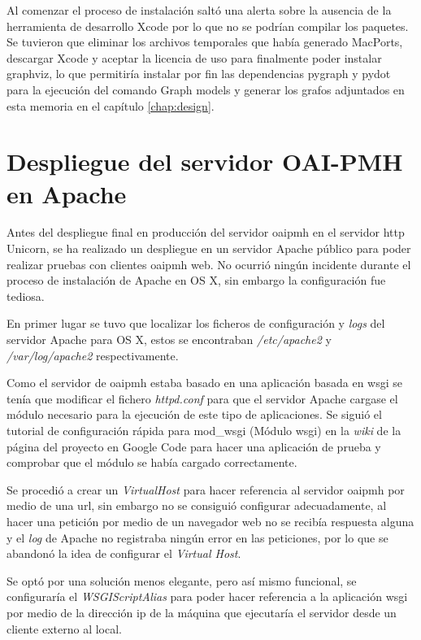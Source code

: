 Al comenzar el proceso de instalación saltó una alerta sobre la ausencia de la herramienta de desarrollo Xcode\cite{Xcode} por lo que no se podrían compilar los paquetes. Se tuvieron que eliminar los archivos temporales que había generado MacPorts, descargar Xcode y aceptar la licencia de uso para finalmente poder instalar graphviz, lo que permitiría instalar por fin las dependencias pygraph y pydot para la ejecución del comando Graph models y generar los grafos adjuntados en esta memoria en el capítulo \ref{chap:design}.

\section{Despliegue del servidor OAI-PMH en Apache}

Antes del despliegue final en producción del servidor \acrshort{oaipmh} en el servidor \acrshort{http} Unicorn\cite{Unicorn}, se ha realizado un despliegue en un servidor Apache público para poder realizar pruebas con clientes \acrshort{oaipmh} web. No ocurrió ningún incidente durante el proceso de instalación de Apache en OS X, sin embargo la configuración fue tediosa.

En primer lugar se tuvo que localizar los ficheros de configuración y \textit{logs} del servidor Apache para OS X, estos se encontraban \textit{/etc/apache2} y \textit{/var/log/apache2} respectivamente.

Como el servidor de \acrshort{oaipmh} estaba basado en una aplicación basada en \acrfull{wsgi} se tenía que modificar el fichero \textit{httpd.conf} para que el servidor Apache cargase el módulo necesario para la ejecución de este tipo de aplicaciones. Se siguió el tutorial de configuración rápida para mod\_wsgi (Módulo \acrshort{wsgi}) en la \textit{wiki} de la página del proyecto en Google Code\cite{GoogleCode} para hacer una aplicación de prueba y comprobar que el módulo se había cargado correctamente\cite{WSGI_tutorial}.

Se procedió a crear un \textit{VirtualHost} para hacer referencia al servidor \acrshort{oaipmh} por medio de una \acrshort{url}, sin embargo no se consiguió configurar adecuadamente, al hacer una petición por medio de un navegador web no se recibía respuesta alguna y el \textit{log} de Apache no registraba ningún error en las peticiones, por lo que se abandonó la idea de configurar el \textit{Virtual Host}.

Se optó por una solución menos elegante, pero así mismo funcional, se configuraría el \textit{WSGIScriptAlias} para poder hacer referencia a la aplicación \acrshort{wsgi} por medio de la dirección \acrshort{ip} de la máquina que ejecutaría el servidor desde un cliente externo al local.

